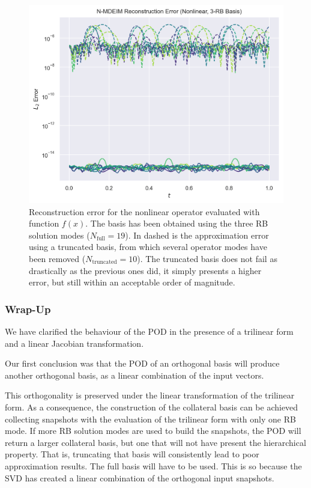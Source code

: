 \documentclass[../../thesis.tex]{subfiles}
\begin{document}
\begin{figure}[h]
    \includegraphics[width=\columnwidth]{research_project/piston/figures/svd_fourier/trilinear_nonlinear/rb_basis_mdeim_errors_nonlinear_num_3.png}
    \caption{Reconstruction error for the nonlinear operator evaluated with function $f(x)$.
    The basis has been obtained using the three RB solution modes ($N_{\text{full}}=19$).
    In dashed is the approximation error using a truncated basis, 
    from which several operator modes have been removed ($N_{\text{truncated}}=10$). 
    The truncated basis does not fail as drastically as the previous ones did, it simply presents a higher error,
    but still within an acceptable order of magnitude.}
    \label{fig:appendix_rb_nonlinear_num_3}
\end{figure}

\subsubsection{Wrap-Up}
We have clarified the behaviour of the POD in the presence of a trilinear form 
and a linear Jacobian transformation.

Our first conclusion was that the POD of an orthogonal basis will produce
another orthogonal basis, as a linear combination of the input vectors.

This orthogonality is preserved under the linear transformation of the trilinear form.
As a consequence, the construction of the collateral basis can be achieved 
collecting snapshots with the evaluation of the trilinear form with 
only one RB mode.
If more RB solution modes are used to build the snapshots, 
the POD will return a larger collateral basis,
but one that will not have present the hierarchical property.
That is, truncating that basis will consistently lead to poor approximation results.
The full basis will have to be used.
This is so because the SVD has created a linear combination of the orthogonal input snapshots.
\end{document}
